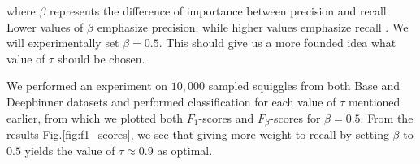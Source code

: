 where $\beta$ represents the difference of importance between precision and recall. Lower values of $\beta$ emphasize precision, while higher values emphasize recall \cite{fbetascore}. We will experimentally set $\beta = 0.5$. This should give us a more founded idea what value of $\tau$ should be chosen.

We performed an experiment on $10,000$ sampled squiggles from both Base and Deepbinner datasets and performed classification for each value of $\tau$ mentioned earlier, from which we plotted both $F_1$-scores and $F_{\beta}$-scores for $\beta = 0.5$. From the results Fig.\ref{fig:f1_scores}, we see that giving more weight to recall by setting $\beta$ to $0.5$ yields the value of $\tau \approx 0.9$ as optimal.

\begin{figure}[!ht]
    \centering

\end{figure}
